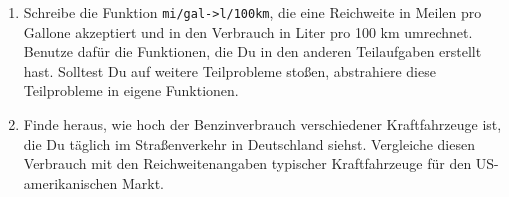 \begin{aufgabe}
\begin{enumerate}
  \item Schreibe die Funktion
    \texttt{mi/gal->l/100km}, die eine Reichweite in Meilen pro
    Gallone akzeptiert und in den Verbrauch in Liter pro 100 km
    umrechnet.  Benutze dafür die Funktionen, die Du in den
    anderen Teilaufgaben erstellt hast.  Solltest Du auf weitere
    Teilprobleme stoßen, abstrahiere diese Teilprobleme in eigene
    Funktionen.

  \item Finde heraus, wie hoch der Benzinverbrauch
    verschiedener Kraftfahrzeuge ist, die Du täglich im
    Straßenverkehr in Deutschland siehst.  Vergleiche diesen
    Verbrauch mit den Reichweitenangaben typischer Kraftfahrzeuge für
    den US-amerikanischen Markt.
  \end{enumerate}

\end{aufgabe}


